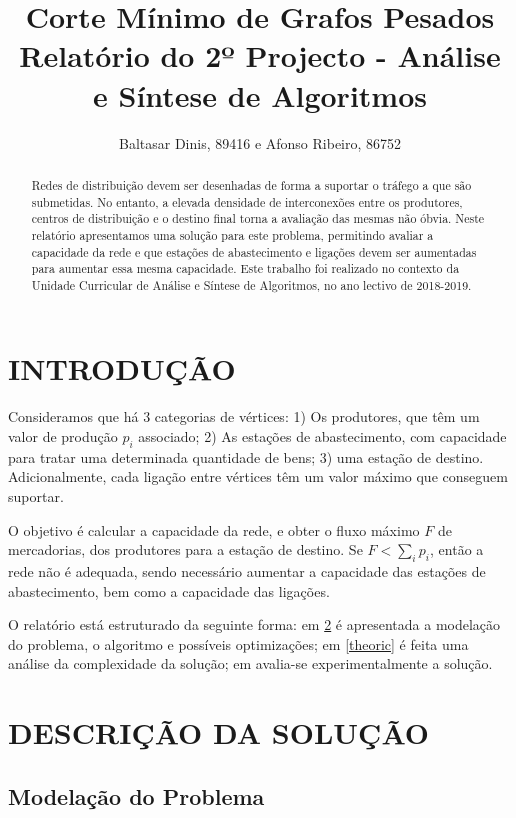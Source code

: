 \documentclass[a4paper, 12pt, conference, portuguese]{ieeeconf}
\title{{\LARGE \bf Corte Mínimo de Grafos Pesados\\}
\large{Relatório do 2º Projecto - Análise e Síntese de Algoritmos} }
\author{Baltasar Dinis, 89416 e Afonso Ribeiro, 86752}
\begin{document}
\maketitle
\thispagestyle{empty}
\pagestyle{empty}

\begin{abstract}
  Redes de distribuição devem ser desenhadas de forma a
  suportar o tráfego a que são submetidas. No entanto, a
  elevada densidade de interconexões entre os produtores,
  centros de distribuição e o destino final torna a avaliação das
  mesmas não óbvia. Neste relatório apresentamos uma solução
  para este problema, permitindo avaliar a capacidade da rede e
  que estações de abastecimento e ligações devem ser aumentadas
  para aumentar essa mesma capacidade. Este trabalho foi
  realizado no contexto da Unidade Curricular de Análise e Síntese
  de Algoritmos, no ano lectivo de 2018-2019.
\end{abstract}

\section{INTRODUÇÃO}\label{intro}

Consideramos que há $3$ categorias de vértices: 1) Os produtores,
que têm um valor de produção $p_i$ associado; 2) As
estações de abastecimento, com capacidade para tratar
uma determinada quantidade de bens; 3) uma estação de destino.
Adicionalmente, cada ligação entre vértices têm um valor máximo
que conseguem suportar.

O objetivo é calcular a capacidade da rede, e obter o fluxo
máximo $F$ de mercadorias, dos produtores para a estação de
destino. Se $F < \sum_i p_i$, então a rede não é adequada, sendo
necessário aumentar a capacidade das estações de abastecimento,
bem como a capacidade das ligações.

O relatório está estruturado da seguinte forma: em \ref{sol} é
apresentada a modelação do problema, o algoritmo e possíveis
optimizações; em \ref{theoric} é feita uma análise da
complexidade da solução; em \label{experimental} avalia-se
experimentalmente a solução.

\section{DESCRIÇÃO DA SOLUÇÃO}\label{sol}

\subsection{Modelação do Problema}
\end{document}

